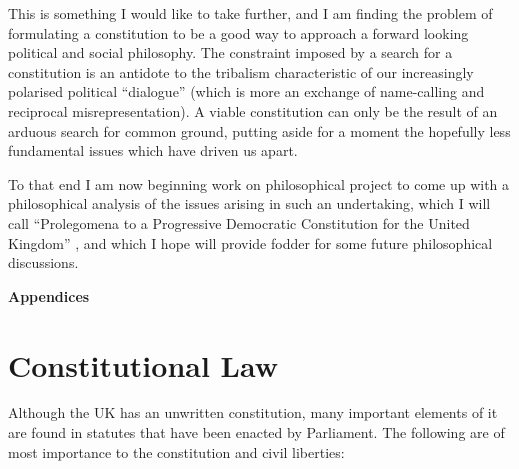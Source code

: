 \documentclass[14pt,titlepage]{extarticle}
\begin{document}
This is something I would like to take further, and I am finding the problem of formulating a constitution to be a good way to approach a forward looking political and social philosophy.
The constraint imposed by a search for a constitution is an antidote to the tribalism characteristic of our increasingly polarised political ``dialogue'' (which is more an exchange of name-calling and reciprocal misrepresentation).
A viable constitution can only be the result of an arduous search for common ground, putting aside for a moment the hopefully less fundamental issues which have driven us apart.

To that end I am now beginning work on philosophical project to come up with a philosophical analysis of the issues arising in such an undertaking, which I will call ``Prolegomena to a Progressive Democratic Constitution for the United Kingdom'' \cite{rbjp032}, and which I hope will provide fodder for some future philosophical discussions.


\pagebreak
{\bf \Large Appendices}
\appendix



\section{Constitutional Law}\label{ConstitutionalLaw}

Although the UK has an unwritten constitution, many important elements of it are found in statutes that have been enacted by Parliament. The following are of most importance to the constitution and civil liberties:
\end{document}
